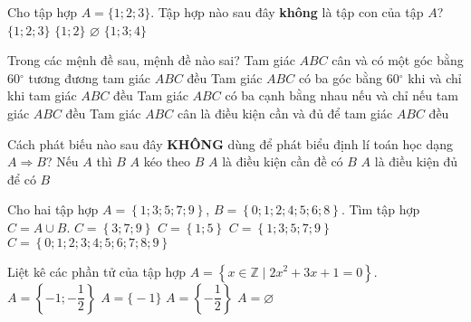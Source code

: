 \begin{ex}%
Cho tập hợp $A=\big\{1;2;3\big\}$. Tập hợp nào sau đây \textbf{không} là tập con của tập $A$?
\choice
{$\big\{1;2;3\big\}$}
{$\big\{1;2\big\}$}
{$\varnothing$}
{\True $\big\{1;3;4\big\}$}
\end{ex}

\begin{ex}%
Trong các mệnh đề sau, mệnh đề nào sai?
\choice
{Tam giác $ABC$ cân và có một góc bằng $60{}^\circ $ tương đương tam giác $ABC$ đều}
{Tam giác $ABC$ có ba góc bằng $60{}^\circ $ khi và chỉ khi tam giác $ABC$ đều}
{Tam giác $ABC$ có ba cạnh bằng nhau nếu và chỉ nếu tam giác $ABC$ đều}
{\True Tam giác $ABC$ cân là điều kiện cần và đủ để tam giác $ABC$ đều}
\end{ex}

\begin{ex}%
Cách phát biếu nào sau đây \textbf{KHÔNG} dùng để phát biểu định lí toán học dạng $A \Rightarrow B$?
\choice
{Nếu $A$ thì $B$}
{$A$ kéo theo $B$}
{\True $A$ là điều kiện cần đề có $B$}
{$A$ là điều kiện đủ để có $B$}
\loigiai{}
\end{ex}

\begin{ex}%
Cho hai tập hợp $A=\left\{ 1; 3; 5; 7; 9 \right\}$, $B=\left\{ 0; 1; 2; 4; 5; 6; 8 \right\}$. Tìm tập hợp $C=A\cup B$.
\choice
{ $C=\left\{ 3; 7; 9 \right\}$}
{ $C=\left\{ 1; 5 \right\}$}
{ $C=\left\{ 1; 3; 5; 7; 9 \right\}$}
{\True $C=\left\{ 0; 1; 2; 3; 4; 5; 6; 7; 8; 9 \right\}$}
\end{ex}

\begin{ex}%
Liệt kê các phần tử của tập hợp $A=\left\{ x \in \mathbb{Z} \mid 2x^2+3x+1=0\right\}$.
\choice
{$A=\left\{ -1;-\dfrac{1}{2} \right\}$}
{\True $A=\big\{-1\big\}$}
{$A=\left\{ -\dfrac{1}{2} \right\}$}
{$A=\varnothing$}
\end{ex}

